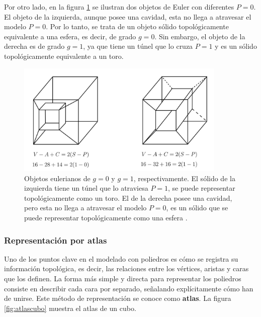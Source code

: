 Por otro lado, en la figura \ref{fig:euler2} se ilustran dos objetos de Euler con diferentes $P=0$. 
El objeto de la izquierda, aunque posee una cavidad, esta no llega a atravesar el modelo $P=0$. Por lo tanto, se trata de un objeto sólido topológicamente equivalente a una esfera, es decir, de grado $g = 0$.\newline
Sin embargo, el objeto de la derecha es de grado $g = 1$, ya que tiene un túnel que lo cruza $P=1$ y es un sólido topológicamente equivalente a un toro.\newline


\begin{figure}[ht]
\includegraphics[width=10cm]{Img/GEO/geo-euler2.jpg}
\centering
\caption{\footnotesize{Objetos eulerianos de $g= 0$ y $g=1$, respectivamente. El sólido de la izquierda tiene un túnel que lo atraviesa $P=1$, se puede representar topológicamente como un toro. El de la derecha posee una cavidad, pero esta no llega a atravesar el modelo $P=0$, es un sólido que se puede representar topológicamente como una esfera \cite{Ramos2011}. }}
\label{fig:euler2}
\end{figure}


\subsubsection{Representación por atlas}
Uno de los puntos clave en el modelado con poliedros es cómo se registra su información topológica, es decir, las relaciones entre los vértices, aristas y caras que los definen.
La forma más simple y directa para representar los poliedros consiste en describir cada cara por separado, señalando explícitamente cómo han de unirse. Este método de representación se conoce como \textbf{atlas}. 
La figura \ref{fig:atlascubo} muestra el atlas de un cubo.

